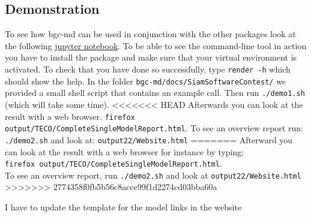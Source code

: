 \documentclass[a4paper]{article}
\begin{document}
\subsection{Demonstration}
To see how bgc-md can be used in conjunction with the other packages look at the following \href{https://github.com/MPIBGC-TEE/bgc-md/blob/master/jupyter_notebooks/Examples/how_to_apply_toolkit_to_yaml_model.ipynb}{jupyter notebook}.
To be able to see the command-line tool in action you have to install the package and make sure that your virtual environment is activated. 
To check that you have done so successfully, type \texttt{render -h} which should show the help.
In the folder \texttt{bgc-md/docs/SiamSoftwareContest/} we provided a small shell script that contains an example call. 
Then run \texttt{./demo1.sh} (which will take some time).
<<<<<<< HEAD
Afterwards you can look at the result with a web browser.
\texttt{firefox output/TECO/CompleteSingleModelReport.html}.
To see an overview report run: \texttt{./demo2.sh} and look at: \texttt{output22/Website.html}
=======
Afterward you can look at the result with a web browser for instance by typing:\\
\texttt{firefox output/TECO/CompleteSingleModelReport.html}.\\
To see an overview report, run \texttt{./demo2.sh} and look at \texttt{output22/Website.html}
>>>>>>> 2774358f0fb5b56c8acce99f1d2274cd03bba60a

{\color{red} I have to update the template for the model links in the website}
\end{document}
